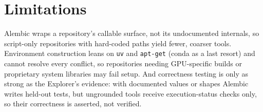 \section*{Limitations}
Alembic wraps a repository's callable surface, not its undocumented internals, so
script-only repositories with hard-coded paths yield fewer, coarser tools.
Environment construction leans on \texttt{uv} and \texttt{apt-get} (conda as a
last resort) and cannot resolve every conflict, so repositories needing
GPU-specific builds or proprietary system libraries may fail setup. And
correctness testing is only as strong as the Explorer's evidence: with documented
values or shapes Alembic writes held-out tests, but ungrounded tools receive
execution-status checks only, so their correctness is asserted, not verified.
